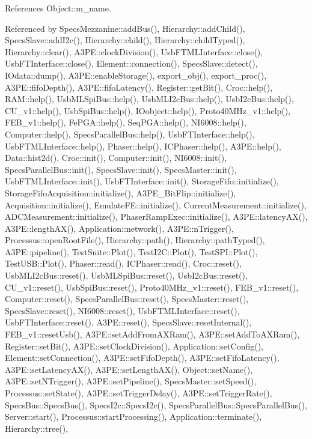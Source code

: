 References Object\+::m\+\_\+name.



Referenced by Specs\+Mezzanine\+::add\+Bus(), Hierarchy\+::add\+Child(), Specs\+Slave\+::add\+I2c(), Hierarchy\+::child(), Hierarchy\+::child\+Typed(), Hierarchy\+::clear(), A3\+P\+E\+::clock\+Division(), Usb\+F\+T\+M\+L\+Interface\+::close(), Usb\+F\+T\+Interface\+::close(), Element\+::connection(), Specs\+Slave\+::detect(), I\+Odata\+::dump(), A3\+P\+E\+::enable\+Storage(), export\+\_\+obj(), export\+\_\+proc(), A3\+P\+E\+::fifo\+Depth(), A3\+P\+E\+::fifo\+Latency(), Register\+::get\+Bit(), Croc\+::help(), R\+A\+M\+::help(), Usb\+M\+L\+Spi\+Bus\+::help(), Usb\+M\+L\+I2c\+Bus\+::help(), Usb\+I2c\+Bus\+::help(), C\+U\+\_\+v1\+::help(), Usb\+Spi\+Bus\+::help(), I\+Oobject\+::help(), Proto40\+M\+Hz\+\_\+v1\+::help(), F\+E\+B\+\_\+v1\+::help(), Fe\+P\+G\+A\+::help(), Seq\+P\+G\+A\+::help(), N\+I6008\+::help(), Computer\+::help(), Specs\+Parallel\+Bus\+::help(), Usb\+F\+T\+Interface\+::help(), Usb\+F\+T\+M\+L\+Interface\+::help(), Phaser\+::help(), I\+C\+Phaser\+::help(), A3\+P\+E\+::help(), Data\+::hist2d(), Croc\+::init(), Computer\+::init(), N\+I6008\+::init(), Specs\+Parallel\+Bus\+::init(), Specs\+Slave\+::init(), Specs\+Master\+::init(), Usb\+F\+T\+M\+L\+Interface\+::init(), Usb\+F\+T\+Interface\+::init(), Storage\+Fifo\+::initialize(), Storage\+Fifo\+Acquisition\+::initialize(), A3\+P\+E\+\_\+\+Bit\+Flip\+::initialize(), Acquisition\+::initialize(), Emulate\+F\+E\+::initialize(), Current\+Measurement\+::initialize(), A\+D\+C\+Measurement\+::initialize(), Phaser\+Ramp\+Exec\+::initialize(), A3\+P\+E\+::latency\+A\+X(), A3\+P\+E\+::length\+A\+X(), Application\+::network(), A3\+P\+E\+::n\+Trigger(), Processus\+::open\+Root\+File(), Hierarchy\+::path(), Hierarchy\+::path\+Typed(), A3\+P\+E\+::pipeline(), Test\+Suite\+::\+Plot(), Test\+I2\+C\+::\+Plot(), Test\+S\+P\+I\+::\+Plot(), Test\+U\+S\+B\+::\+Plot(), Phaser\+::read(), I\+C\+Phaser\+::read(), Croc\+::reset(), Usb\+M\+L\+I2c\+Bus\+::reset(), Usb\+M\+L\+Spi\+Bus\+::reset(), Usb\+I2c\+Bus\+::reset(), C\+U\+\_\+v1\+::reset(), Usb\+Spi\+Bus\+::reset(), Proto40\+M\+Hz\+\_\+v1\+::reset(), F\+E\+B\+\_\+v1\+::reset(), Computer\+::reset(), Specs\+Parallel\+Bus\+::reset(), Specs\+Master\+::reset(), Specs\+Slave\+::reset(), N\+I6008\+::reset(), Usb\+F\+T\+M\+L\+Interface\+::reset(), Usb\+F\+T\+Interface\+::reset(), A3\+P\+E\+::reset(), Specs\+Slave\+::reset\+Internal(), F\+E\+B\+\_\+v1\+::reset\+Usb(), A3\+P\+E\+::set\+Add\+From\+A\+X\+Ram(), A3\+P\+E\+::set\+Add\+To\+A\+X\+Ram(), Register\+::set\+Bit(), A3\+P\+E\+::set\+Clock\+Division(), Application\+::set\+Config(), Element\+::set\+Connection(), A3\+P\+E\+::set\+Fifo\+Depth(), A3\+P\+E\+::set\+Fifo\+Latency(), A3\+P\+E\+::set\+Latency\+A\+X(), A3\+P\+E\+::set\+Length\+A\+X(), Object\+::set\+Name(), A3\+P\+E\+::set\+N\+Trigger(), A3\+P\+E\+::set\+Pipeline(), Specs\+Master\+::set\+Speed(), Processus\+::set\+State(), A3\+P\+E\+::set\+Trigger\+Delay(), A3\+P\+E\+::set\+Trigger\+Rate(), Specs\+Bus\+::\+Specs\+Bus(), Specs\+I2c\+::\+Specs\+I2c(), Specs\+Parallel\+Bus\+::\+Specs\+Parallel\+Bus(), Server\+::start(), Processus\+::start\+Processing(), Application\+::terminate(), Hierarchy\+::tree(), 